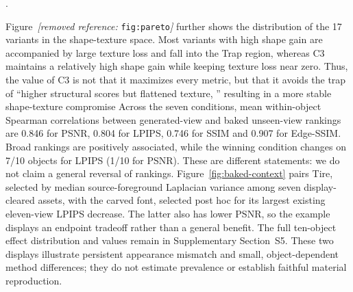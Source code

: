 \documentclass[times,twocolumn,final]{elsarticle}
\providecommand{\DIFadd}[1]{{\protect\color{blue} \sf #1}} %
\providecommand{\DIFdel}[1]{{\protect\color{red} \scriptsize #1}} %
\providecommand{\DIFaddbegin}{} %
\providecommand{\DIFaddend}{} %
\providecommand{\DIFdelbegin}{} %
\providecommand{\DIFdelend}{} %
\begin{document}
\DIFdelend \DIFaddbegin \DIFadd{.
}\DIFaddend

\DIFdelbegin \DIFdel{Figure~\textit{[removed reference: }\texttt{fig:pareto}\textit{]} further shows the distribution of the 17 variants in the shape-texture space.
Most variants with high shape gain are accompanied by large texture loss and fall into the Trap region, whereas C3 maintains a relatively high shape gain while keeping texture loss near zero. Thus, the value of C3 is not that it maximizes every metric, but that it avoids the trap of ``higher structural scores but flattened texture, '' resulting in a more stable shape-texture compromise}\DIFdelend \DIFaddbegin \DIFadd{Across the seven conditions, mean within-object Spearman correlations between generated-view and baked unseen-view rankings are 0.846 for PSNR, 0.804 for LPIPS, 0.746 for SSIM and 0.907 for Edge-SSIM. Broad rankings are positively associated, while the winning condition changes on 7/10 objects for LPIPS (1/10 for PSNR). These are different statements: we do not claim a general reversal of rankings. Figure~\ref{fig:baked-context} pairs Tire, selected by median source-foreground Laplacian variance among seven display-cleared assets, with the carved font, selected post hoc for its largest existing eleven-view LPIPS decrease. The latter also has lower PSNR, so the example displays an endpoint tradeoff rather than a general benefit. The full ten-object effect distribution and values remain in Supplementary Section~S5. These two displays illustrate persistent appearance mismatch and small, object-dependent method differences; they do not estimate prevalence or establish faithful material reproduction}\DIFaddend .
\end{document}
